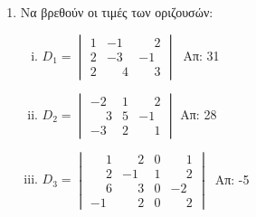 \documentclass[a4paper,12pt]{article}
\begin{document}
\begin{center}
\end{center}

\vspace{2\baselineskip}

\begin{enumerate}


\item Να βρεθούν οι τιμές των οριζουσών:

\begin{enumerate}[i)]
\item 
\(
D_1=\begin{vmatrix}
1 & -1 & \phantom{-}2 \\
2 & -3 & -1 \\
2 & \phantom{-}4 & \phantom{-}3
\end{vmatrix}\
\)  \hfill Απ: 31

\item 
\(
D_2=\begin{vmatrix}
-2 & 1 & \phantom{-}2 \\
\phantom{-}3 & 5 & -1 \\
-3 & 2 & \phantom{-}1
\end{vmatrix}
\)  \hfill Απ: 28

\item 
\(
D_3=\begin{vmatrix}
\phantom{-}1 & \phantom{-}2 & 0 & \phantom{-}1 \\
\phantom{-}2 & -1 & 1 & \phantom{-}2 \\
\phantom{-}6 & \phantom{-}3 & 0 & -2 \\
-1 & \phantom{-}2 & 0 & \phantom{-}2
\end{vmatrix}\
\) \hfill Απ: -5
\end{enumerate}

\end{enumerate}
\end{document}
